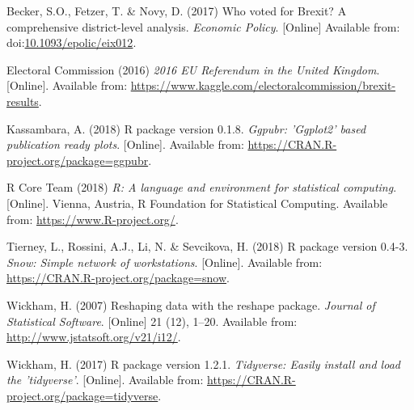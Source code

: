 \documentclass[]{article}
\begin{document}
\leavevmode\hypertarget{ref-Becker2017}{}%
Becker, S.O., Fetzer, T. \& Novy, D. (2017) Who voted for Brexit? A
comprehensive district-level analysis. \emph{Economic Policy}.
{[}Online{]} Available from:
doi:\href{https://doi.org/10.1093/epolic/eix012}{10.1093/epolic/eix012}.

\leavevmode\hypertarget{ref-ElectoralCommission2016}{}%
Electoral Commission (2016) \emph{2016 EU Referendum in the United
Kingdom}. {[}Online{]}. Available from:
\url{https://www.kaggle.com/electoralcommission/brexit-results}.

\leavevmode\hypertarget{ref-ggpubr}{}%
Kassambara, A. (2018) R package version 0.1.8. \emph{Ggpubr: 'Ggplot2'
based publication ready plots}. {[}Online{]}. Available from:
\url{https://CRAN.R-project.org/package=ggpubr}.

\leavevmode\hypertarget{ref-r}{}%
R Core Team (2018) \emph{R: A language and environment for statistical
computing}. {[}Online{]}. Vienna, Austria, R Foundation for Statistical
Computing. Available from: \url{https://www.R-project.org/}.

\leavevmode\hypertarget{ref-snow}{}%
Tierney, L., Rossini, A.J., Li, N. \& Sevcikova, H. (2018) R package
version 0.4-3. \emph{Snow: Simple network of workstations}.
{[}Online{]}. Available from:
\url{https://CRAN.R-project.org/package=snow}.

\leavevmode\hypertarget{ref-reshape2}{}%
Wickham, H. (2007) Reshaping data with the reshape package.
\emph{Journal of Statistical Software}. {[}Online{]} 21 (12), 1--20.
Available from: \url{http://www.jstatsoft.org/v21/i12/}.

\leavevmode\hypertarget{ref-tidyverse}{}%
Wickham, H. (2017) R package version 1.2.1. \emph{Tidyverse: Easily
install and load the 'tidyverse'}. {[}Online{]}. Available from:
\url{https://CRAN.R-project.org/package=tidyverse}.
\end{document}
